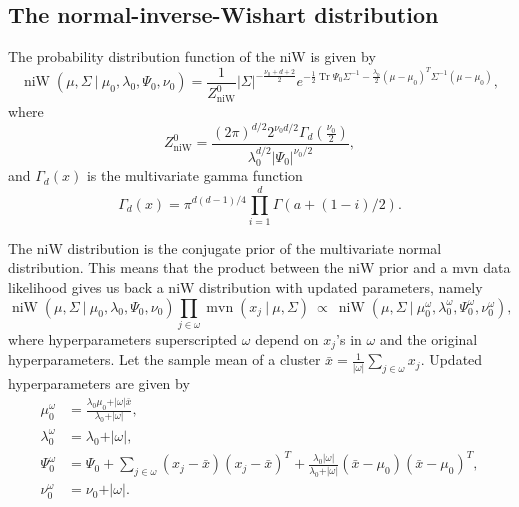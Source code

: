 \documentclass[11pt, oneside]{article}   	%
\DeclareMathOperator{\Tr}{Tr}
\DeclareMathOperator{\niW}{niW}
\begin{document}
\subsection{The normal-inverse-Wishart distribution}
The probability distribution function of the niW is given by
\begin{equation}
\niW(\mu, \Sigma~\vert~\mu_0, \lambda_0,\Psi_0,\nu_0) = \frac{1}{Z_{\niW}^0} \vert\Sigma\vert^{-\frac{\nu_0 + d + 2}{2}}e^{-\frac{1}{2}\Tr\Psi_0\Sigma^{-1} - \frac{\lambda_0}{2}(\mu - \mu_0)^T\Sigma^{-1}(\mu - \mu_0)},
\label{eq:niW}\end{equation}
where 
$$Z_{\niW}^0 = \frac{(2\pi)^{d/2} 2^{\nu_0 d/2} \Gamma_d(\frac{\nu_0}{2})}{\lambda_0^{d/2}\vert\Psi_0\vert^{\nu_0/2}},$$
and $\Gamma_d(x)$ is the multivariate gamma function
$$\Gamma_d(x) = \pi^{d(d-1)/4}\prod_{i=1}^d\Gamma(a + (1 - i)/2).$$

The niW distribution is the conjugate prior of the multivariate normal distribution. This means that the product between the niW prior and a mvn data likelihood gives us back a niW distribution with updated parameters, namely
\begin{equation}\niW(\mu, \Sigma~\vert~ \mu_0, \lambda_0,\Psi_0,\nu_0)\prod_{j\in\omega}\operatorname{mvn}(x_j~\vert~\mu,\Sigma)~\propto~\niW(\mu,\Sigma~\vert~\mu_0^\omega,\lambda_0^\omega,\Psi_0^\omega,\nu_0^\omega),
\label{eq:conjugation}\end{equation}
where hyperparameters superscripted $\omega$ depend on $x_j$'s in $\omega$ and the original hyperparameters. Let the sample mean of a cluster $\bar x = \frac{1}{\vert\omega\vert}\sum_{j\in\omega} x_j$. Updated hyperparameters are given by
\begin{equation}\begin{split}
\mu_0^\omega &= \frac{\lambda_0 \mu_0 + \vert\omega\vert \bar x}{\lambda_0 + \vert\omega\vert}, \\
\lambda_0^\omega &= \lambda_0 + \vert\omega\vert,\\
\Psi_0^\omega &= \Psi_0 + \sum_{j\in\omega}(x_j - \bar x)(x_j - \bar x)^T + \frac{\lambda_0\vert\omega\vert}{\lambda_0 + \vert\omega\vert}(\bar x - \mu_0)(\bar x - \mu_0)^T,\\
\nu_0^\omega &= \nu_0 + \vert\omega\vert.
\label{eq:updatedhp}\end{split}\end{equation}
\end{document}
